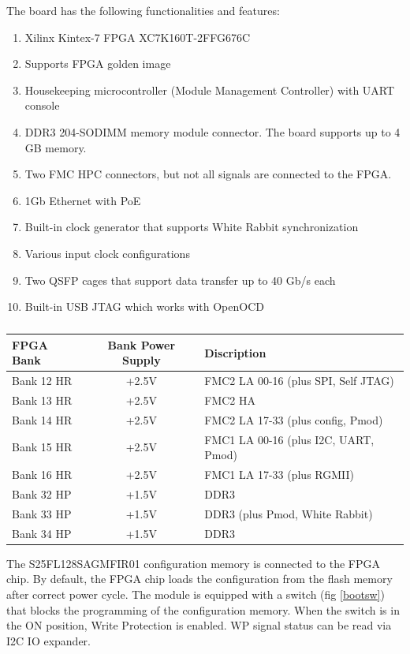 \documentclass[12pt,oneside,a4]{article}
\begin{document}
The board has the following functionalities and features:
\begin{enumerate}
	\item Xilinx Kintex-7 FPGA XC7K160T-2FFG676C
	\item Supports FPGA golden image
	\item Housekeeping microcontroller (Module Management Controller) with UART console
	\item DDR3 204-SODIMM memory module connector. The board supports up to 4 GB memory.
	\item Two FMC HPC connectors, but not all signals are connected to the FPGA.
	\item 1Gb Ethernet with PoE
	\item Built-in clock generator that supports White Rabbit synchronization
	\item Various input clock configurations
	\item Two QSFP cages that support data transfer up to 40 Gb/s each
	\item Built-in USB JTAG which works with OpenOCD
\end{enumerate}


\begin{table}[htbp]
\centering
\begin{tabular}{@{}lcl@{}}
\toprule
FPGA Bank  & Bank Power Supply & Discription \\ \midrule
Bank 12 HR & +2.5V             & FMC2 LA 00-16 (plus SPI, Self JTAG) \\
Bank 13 HR & +2.5V             & FMC2 HA\\
Bank 14 HR & +2.5V             & FMC2 LA 17-33 (plus config, Pmod)\\
Bank 15 HR & +2.5V             & FMC1 LA 00-16 (plus I2C, UART, Pmod)\\
Bank 16 HR & +2.5V             & FMC1 LA 17-33 (plus RGMII)\\
Bank 32 HP & +1.5V             & DDR3        \\
Bank 33 HP & +1.5V             & DDR3 (plus Pmod, White Rabbit) \\
Bank 34 HP & +1.5V             & DDR3       \\ \bottomrule
\end{tabular}
\caption{}
\label{tab:banks}
\end{table}

The S25FL128SAGMFIR01 configuration memory is connected to the FPGA chip. By default, the FPGA chip loads the configuration from the flash memory after correct power cycle. The module is equipped with a switch (fig \ref{bootsw}) that blocks the programming of the configuration memory. When the switch is in the ON position, Write Protection is enabled. WP signal status can be read via I2C IO expander.
\end{document}
